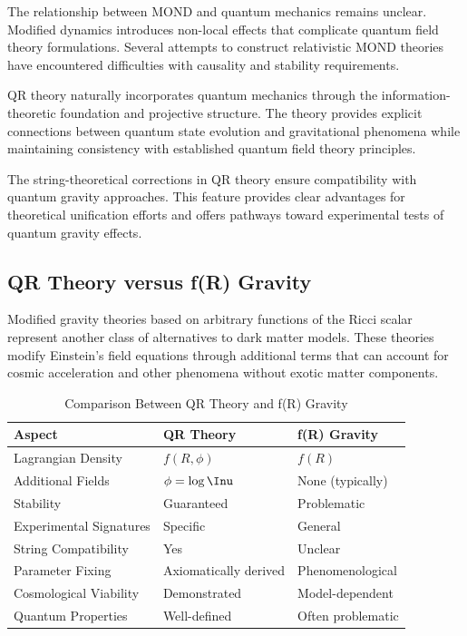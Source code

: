The relationship between MOND and quantum mechanics remains unclear. Modified dynamics introduces non-local effects that complicate quantum field theory formulations. Several attempts to construct relativistic MOND theories have encountered difficulties with causality and stability requirements.

QR theory naturally incorporates quantum mechanics through the information-theoretic foundation and projective structure. The theory provides explicit connections between quantum state evolution and gravitational phenomena while maintaining consistency with established quantum field theory principles.

The string-theoretical corrections in QR theory ensure compatibility with quantum gravity approaches. This feature provides clear advantages for theoretical unification efforts and offers pathways toward experimental tests of quantum gravity effects.

\subsection{QR Theory versus f(R) Gravity}
\label{subsec:qr-vs-fr}

Modified gravity theories based on arbitrary functions of the Ricci scalar represent another class of alternatives to dark matter models. These theories modify Einstein’s field equations through additional terms that can account for cosmic acceleration and other phenomena without exotic matter components.

\begin{table}[H]
\caption{Comparison Between QR Theory and f(R) Gravity}
\label{tab:qr-vs-fr}
\centering
\begin{tabular}{@{}lll@{}}
\toprule
\textbf{Aspect} & \textbf{QR Theory} & \textbf{f(R) Gravity} \\
\midrule
Lagrangian Density & $f(R,\phi)$ & $f(R)$ \\
Additional Fields & $\phi = \log \Inu$ & None (typically) \\
Stability & Guaranteed & Problematic \\
Experimental Signatures & Specific & General \\
String Compatibility & Yes & Unclear \\
Parameter Fixing & Axiomatically derived & Phenomenological \\
Cosmological Viability & Demonstrated & Model-dependent \\
Quantum Properties & Well-defined & Often problematic \\
\bottomrule
\end{tabular}
\end{table}

